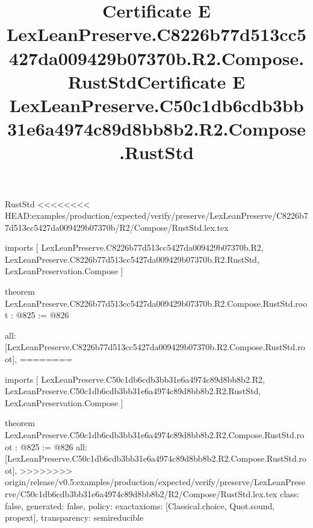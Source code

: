 \begin{lexlean}{RustStd}
<<<<<<<< HEAD:examples/production/expected/verify/preserve/LexLeanPreserve/C8226b77d513cc5427da009429b07370b/R2/Compose/RustStd.lex.tex
\title{Certificate E LexLeanPreserve.C8226b77d513cc5427da009429b07370b.R2.Compose.RustStd}
\begin{coremodule}
imports [
  LexLeanPreserve.C8226b77d513cc5427da009429b07370b.R2,
  LexLeanPreserve.C8226b77d513cc5427da009429b07370b.R2.RustStd,
  LexLeanPreservation.Compose
]

theorem LexLeanPreserve.C8226b77d513cc5427da009429b07370b.R2.Compose.RustStd.root : @825 := @826 {
  all: [LexLeanPreserve.C8226b77d513cc5427da009429b07370b.R2.Compose.RustStd.root],
========
\title{Certificate E LexLeanPreserve.C50c1db6cdb3bb31e6a4974c89d8bb8b2.R2.Compose.RustStd}
\begin{coremodule}
imports [
  LexLeanPreserve.C50c1db6cdb3bb31e6a4974c89d8bb8b2.R2,
  LexLeanPreserve.C50c1db6cdb3bb31e6a4974c89d8bb8b2.R2.RustStd,
  LexLeanPreservation.Compose
]

theorem LexLeanPreserve.C50c1db6cdb3bb31e6a4974c89d8bb8b2.R2.Compose.RustStd.root : @825 := @826 {
  all: [LexLeanPreserve.C50c1db6cdb3bb31e6a4974c89d8bb8b2.R2.Compose.RustStd.root],
>>>>>>>> origin/release/v0.5:examples/production/expected/verify/preserve/LexLeanPreserve/C50c1db6cdb3bb31e6a4974c89d8bb8b2/R2/Compose/RustStd.lex.tex
  class: false,
  generated: false,
  policy: exact{axioms: [Classical.choice, Quot.sound, propext]},
  transparency: semireducible
}


\end{coremodule}}
\end{coremodule}
\end{lexlean}

